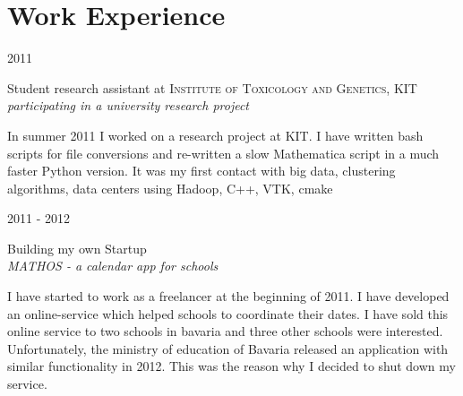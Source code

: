 \documentclass[a4paper,10pt]{article} %
\begin{document}
{\begin{minipage}[t]{0.44\textwidth}

\end{minipage} %

\begin{minipage}[t]{0.5\textwidth}
\vspace{0pt} %


\section{Work Experience}

{\raggedleft\textsc{2011}\par}

{\raggedright\large Student research assistant at \textsc{ Institute of Toxicology and Genetics}, KIT\\
\textit{participating in a university research project}\\[5pt]}

\normalsize{In summer 2011 I worked on a
research project at KIT. I have written bash scripts for file
conversions and re-written a slow Mathematica script
in a much faster Python version. It was my first contact with big data,
clustering algorithms, data centers using Hadoop, C++, VTK, cmake}\\


{\raggedleft\textsc{2011 - 2012}\par}

{\raggedright\large Building my own Startup\\
\textit{MATHOS - a calendar app for schools}\\[5pt]}

\normalsize{I have started to work as a freelancer at the beginning
of 2011. I have developed an online-service which helped
schools to coordinate their dates. I have sold this online service to
two schools in bavaria and three other schools were interested.
Unfortunately, the ministry of education of Bavaria
released an application with similar functionality in
2012. This was the reason why I decided to shut down my service.}\\


\end{minipage}}
\end{document}
